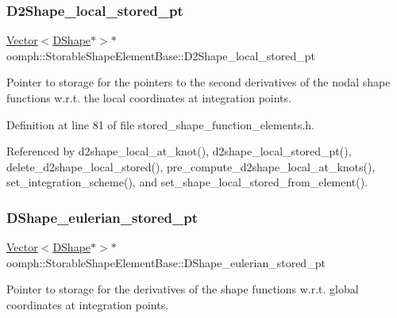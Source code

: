 \subsubsection{\texorpdfstring{D2\+Shape\+\_\+local\+\_\+stored\+\_\+pt}{D2Shape\_local\_stored\_pt}}
{\footnotesize\ttfamily \hyperlink{classoomph_1_1Vector}{Vector}$<$\hyperlink{classoomph_1_1DShape}{D\+Shape}$\ast$$>$$\ast$ oomph\+::\+Storable\+Shape\+Element\+Base\+::\+D2\+Shape\+\_\+local\+\_\+stored\+\_\+pt\hspace{0.3cm}{\ttfamily [private]}}



Pointer to storage for the pointers to the second derivatives of the nodal shape functions w.\+r.\+t. the local coordinates at integration points. 



Definition at line 81 of file stored\+\_\+shape\+\_\+function\+\_\+elements.\+h.



Referenced by d2shape\+\_\+local\+\_\+at\+\_\+knot(), d2shape\+\_\+local\+\_\+stored\+\_\+pt(), delete\+\_\+d2shape\+\_\+local\+\_\+stored(), pre\+\_\+compute\+\_\+d2shape\+\_\+local\+\_\+at\+\_\+knots(), set\+\_\+integration\+\_\+scheme(), and set\+\_\+shape\+\_\+local\+\_\+stored\+\_\+from\+\_\+element().

\mbox{\label{classoomph_1_1StorableShapeElementBase_adf09f33c95feea7f69a764b2311f8d76}} 
\subsubsection{\texorpdfstring{D\+Shape\+\_\+eulerian\+\_\+stored\+\_\+pt}{DShape\_eulerian\_stored\_pt}}
{\footnotesize\ttfamily \hyperlink{classoomph_1_1Vector}{Vector}$<$\hyperlink{classoomph_1_1DShape}{D\+Shape}$\ast$$>$$\ast$ oomph\+::\+Storable\+Shape\+Element\+Base\+::\+D\+Shape\+\_\+eulerian\+\_\+stored\+\_\+pt\hspace{0.3cm}{\ttfamily [private]}}



Pointer to storage for the derivatives of the shape functions w.\+r.\+t. global coordinates at integration points. 




